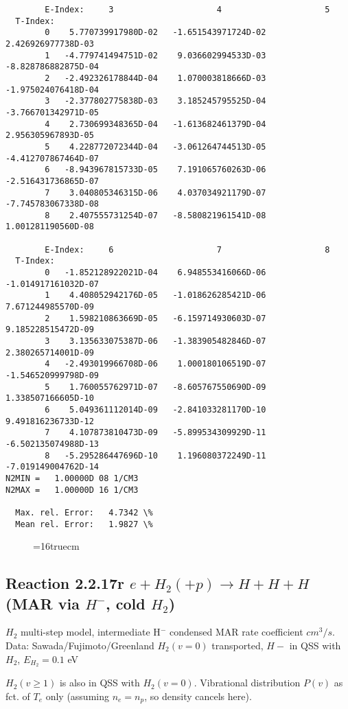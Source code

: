 \documentclass[12pt,dvipdfmx]{article}
\begin{document}
{\begin{small}
\begin{verbatim}
        E-Index:     3                     4                     5
  T-Index:
        0    5.770739917980D-02   -1.651543971724D-02    2.426926977738D-03
        1   -4.779741494751D-02    9.036602994533D-03   -8.828786882875D-04
        2   -2.492326178844D-04    1.070003818666D-03   -1.975024076418D-04
        3   -2.377802775838D-03    3.185245795525D-04   -3.766701342971D-05
        4    2.730699348365D-04   -1.613682461379D-04    2.956305967893D-05
        5    4.228772072344D-04   -3.061264744513D-05   -4.412707867464D-07
        6   -8.943967815733D-05    7.191065760263D-06   -2.516431736865D-07
        7    3.040805346315D-06    4.037034921179D-07   -7.745783067338D-08
        8    2.407555731254D-07   -8.580821961541D-08    1.001281190560D-08

        E-Index:     6                     7                     8
  T-Index:
        0   -1.852128922021D-04    6.948553416066D-06   -1.014917161032D-07
        1    4.408052942176D-05   -1.018626285421D-06    7.671244985570D-09
        2    1.598210863669D-05   -6.159714930603D-07    9.185228515472D-09
        3    3.135633075387D-06   -1.383905482846D-07    2.380265714001D-09
        4   -2.493019966708D-06    1.000180106519D-07   -1.546520999798D-09
        5    1.760055762971D-07   -8.605767550690D-09    1.338507166605D-10
        6    5.049361112014D-09   -2.841033281170D-10    9.491816236733D-12
        7    4.107873810473D-09   -5.899534309929D-11   -6.502135074988D-13
        8   -5.295286447696D-10    1.196080372249D-11   -7.019149004762D-14
N2MIN =   1.00000D 08 1/CM3
N2MAX =   1.00000D 16 1/CM3

  Max. rel. Error:   4.7342 \%
  Mean rel. Error:   1.9827 \%
\end{verbatim}\end{small}
\begin{figure} \label{7.2.3b}
\epsfxsize=16truecm
\end{figure}
\newpage

\subsection{
Reaction 2.2.17r   $e + H_2 (+p)   \rightarrow H + H + H  $ (MAR via $H^-$, cold $H_2$)
}

$H_2$ multi-step model, intermediate H$^-$ condensed MAR rate coefficient $cm^3/s$.
Data: Sawada/Fujimoto/Greenland \cite{kn:Sawada}
$H_2(v=0)$ transported, $H-$ in QSS with $H_2$, $E_{H_2}=0.1$ eV

$H_2(v\geq 1)$ is also in QSS with $H_2(v=0)$. Vibrational distribution $P(v)$ as fct. of $T_e$ only (assuming $n_e=n_p$, so density cancels here).

}
\end{document}
